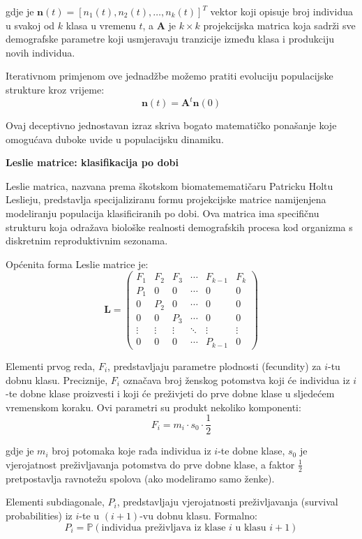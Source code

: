 \documentclass[11pt,oneside]{book}
\begin{document}
gdje je $\mathbf{n}(t) = [n_1(t), n_2(t), \ldots, n_k(t)]^T$ vektor koji opisuje broj individua u svakoj od $k$ klasa u vremenu $t$, a $\mathbf{A}$ je $k \times k$ projekcijska matrica koja sadrži sve demografske parametre koji usmjeravaju tranzicije između klasa i produkciju novih individua.

Iterativnom primjenom ove jednadžbe možemo pratiti evoluciju populacijske strukture kroz vrijeme:
$$\mathbf{n}(t) = \mathbf{A}^t \mathbf{n}(0)$$

Ovaj deceptivno jednostavan izraz skriva bogato matematičko ponašanje koje omogućava duboke uvide u populacijsku dinamiku.

\textbf{Leslie matrice: klasifikacija po dobi}

Leslie matrica, nazvana prema škotskom biomatemematičaru Patricku Holtu Leslieju, predstavlja specijaliziranu formu projekcijske matrice namijenjena modeliranju populacija klasificiranih po dobi. Ova matrica ima specifičnu strukturu koja odražava biološke realnosti demografskih procesa kod organizma s diskretnim reproduktivnim sezonama.

Općenita forma Leslie matrice je:
$$\mathbf{L} = \begin{pmatrix}
	F_1 & F_2 & F_3 & \cdots & F_{k-1} & F_k \\
	P_1 & 0 & 0 & \cdots & 0 & 0 \\
	0 & P_2 & 0 & \cdots & 0 & 0 \\
	0 & 0 & P_3 & \cdots & 0 & 0 \\
	\vdots & \vdots & \vdots & \ddots & \vdots & \vdots \\
	0 & 0 & 0 & \cdots & P_{k-1} & 0
\end{pmatrix}$$

Elementi prvog reda, $F_i$, predstavljaju parametre plodnosti (fecundity) za $i$-tu dobnu klasu. Preciznije, $F_i$ označava broj ženskog potomstva koji će individua iz $i$-te dobne klase proizvesti i koji će preživjeti do prve dobne klase u sljedećem vremenskom koraku. Ovi parametri su produkt nekoliko komponenti:
$$F_i = m_i \cdot s_0 \cdot \frac{1}{2}$$

gdje je $m_i$ broj potomaka koje rađa individua iz $i$-te dobne klase, $s_0$ je vjerojatnost preživljavanja potomstva do prve dobne klase, a faktor $\frac{1}{2}$ pretpostavlja ravnotežu spolova (ako modeliramo samo ženke).

Elementi subdiagonale, $P_i$, predstavljaju vjerojatnosti preživljavanja (survival probabilities) iz $i$-te u $(i+1)$-vu dobnu klasu. Formalno:
$$P_i = \mathbb{P}(\text{individua preživljava iz klase } i \text{ u klasu } i+1)$$
\end{document}
